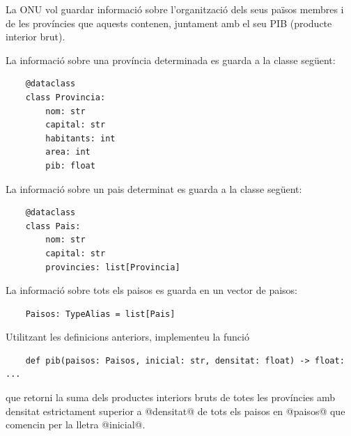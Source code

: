 
\Statement

La ONU vol guardar informació sobre l'organització dels seus països membres
i de les províncies que aquests contenen, juntament amb el seu PIB (producte
interior brut). 

\medskip

La informació sobre una província determinada es guarda a la classe següent:

\lstset{language=Python}
\begin{lstlisting}
    @dataclass
    class Provincia:
        nom: str
        capital: str
        habitants: int
        area: int
        pib: float
\end{lstlisting}


La informació sobre un pais determinat es guarda a la classe següent:

\begin{lstlisting}
    @dataclass
    class Pais:
        nom: str
        capital: str
        provincies: list[Provincia]
\end{lstlisting}

La informació sobre tots els paisos es guarda en un vector de paisos:


\begin{lstlisting}
    Paisos: TypeAlias = list[Pais]
\end{lstlisting}

Utilitzant les definicions anteriors, implementeu la funció

\begin{lstlisting}
    def pib(paisos: Paisos, inicial: str, densitat: float) -> float: ...
\end{lstlisting}

que retorni la suma dels productes interiors bruts de totes les províncies
amb densitat estrictament superior a @densitat@
de tots els paisos en @paisos@ que comencin per la lletra @inicial@.


\ObservationNoMainTuples
